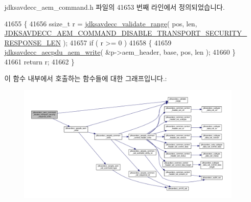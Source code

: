 jdksavdecc\+\_\+aem\+\_\+command.\+h 파일의 41653 번째 라인에서 정의되었습니다.


\begin{DoxyCode}
41655 \{
41656     ssize\_t r = \hyperlink{group__util_ga9c02bdfe76c69163647c3196db7a73a1}{jdksavdecc\_validate\_range}( pos, len, 
      \hyperlink{group__command__disable__transport__security__response_gaa2a1ce5fdb725aaac5f7a4c2892aa70a}{JDKSAVDECC\_AEM\_COMMAND\_DISABLE\_TRANSPORT\_SECURITY\_RESPONSE\_LEN}
       );
41657     \textcolor{keywordflow}{if} ( r >= 0 )
41658     \{
41659         \hyperlink{group__aecpdu__aem_gad658e55771cce77cecf7aae91e1dcbc5}{jdksavdecc\_aecpdu\_aem\_write}( &p->aem\_header, base, pos, len );
41660     \}
41661     \textcolor{keywordflow}{return} r;
41662 \}
\end{DoxyCode}


이 함수 내부에서 호출하는 함수들에 대한 그래프입니다.\+:
\nopagebreak
\begin{figure}[H]
\begin{center}
\leavevmode
\includegraphics[width=350pt]{group__command__disable__transport__security__response_ga56ead85142625a6b4839c7377e0ff4db_cgraph}
\end{center}
\end{figure}


